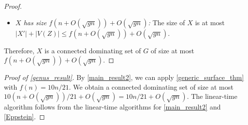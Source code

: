 \begin{proof}
\begin{itemize}
    \item \emph{$X$ has size $f(n + O(\sqrt{gn}))+O(\sqrt{gn})$:} The size of $X$ is at most $|X'| + |V(Z)|\le f(n + O(\sqrt{gn})) + O(\sqrt{gn})$.
\end{itemize}
Therefore, $X$ is a connected dominating set of $G$ of size at most $f(n+O(\sqrt{gn}))+ O(\sqrt{gn})$.
\end{proof}

\begin{proof}[Proof of \cref{genus_result}]
    By \cref{main_result2}, we can apply \cref{generic_surface_thm} with $f(n)= 10n/21$. We obtain a connected dominating set of size at most $10 (n + O(\sqrt{gn}))/21 + O(\sqrt{gn}) = 10n/21 + O(\sqrt{gn})$.
    The linear-time algorithm follows from the linear-time algorithms for \cref{main_result2} and \cref{Eppstein}.
\end{proof}



